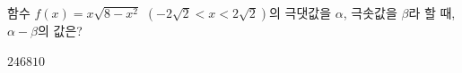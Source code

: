 함수 $f(x)=x\sqrt{8-x^2}$ $(-2\sqrt{2}<x<2\sqrt{2})$의 극댓값을 $\alpha$, 극솟값을 $\beta$라 할 때, $\alpha-\beta$의 값은?
\begin{choices32}{$2$}{$4$}{$6$}{$8$}{$10$}\end{choices32}
